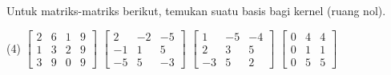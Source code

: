 \begin{exercise}
Untuk matriks-matriks berikut, temukan suatu basis bagi kernel (ruang nol).
\begin{tasks}(4)
\task
$\begin{bmatrix}
2 & 6 & 1 & 9 \\
1 & 3 & 2 & 9 \\
3 & 9 & 0 & 9
\end{bmatrix}$
\task
$
\begin{bmatrix}
2 & -2 & -5 \\
-1 & 1 & 5 \\
-5 & 5 & -3
\end{bmatrix}$
\task
$
\begin{bmatrix}
1 & -5 & -4 \\
2 & 3 & 5 \\
-3 & 5 & 2
\end{bmatrix}$
\task
$
\begin{bmatrix}
0 & 4 & 4 \\
0 & 1 & 1 \\
0 & 5 & 5
\end{bmatrix}$
\end{tasks}
\end{exercise}

